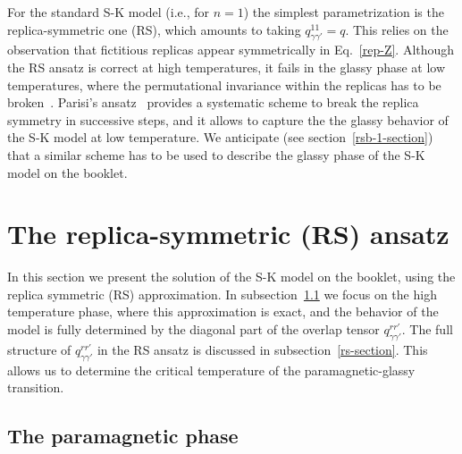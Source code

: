 \documentclass[twocolumn,superscriptaddress,prb,10pt]{revtex4-1}
\begin{document}
For the standard S-K model (i.e., for $n=1$) the simplest parametrization is the 
replica-symmetric one (RS), which amounts to taking $q^{11}_{\gamma\gamma'}=q$. 
This relies on the observation that fictitious replicas appear symmetrically 
in Eq.~\eqref{rep-Z}. Although the RS ansatz is correct at high temperatures, it 
fails in the glassy phase at low temperatures, where the permutational invariance 
within the replicas has to be broken~\cite{almeida-1978}. Parisi's ansatz~\cite{parisi-1979}
provides a systematic scheme to break the replica symmetry in successive steps, and it  
allows to capture the the glassy behavior of the S-K model at low temperature. 
We anticipate (see section~\ref{rsb-1-section}) that a similar scheme has to be used to 
describe the glassy phase of the S-K model on the booklet. 


\section{The replica-symmetric (RS) ansatz}
\label{solution}

In this section we present the solution of the S-K model on the booklet, using 
the replica symmetric (RS) approximation. In subsection~\ref{para-section} we focus 
on the high temperature phase, where this approximation is exact, and the 
behavior of the model is fully determined by the diagonal part of the overlap 
tensor $q_{\gamma\gamma'}^{rr'}$. The full structure of $q_{\gamma\gamma'}^{rr'}$ 
in the RS ansatz  is discussed in subsection~\ref{rs-section}. This allows us to 
determine the critical temperature of the paramagnetic-glassy transition. 

\subsection{The paramagnetic phase}
\label{para-section}
\end{document}

